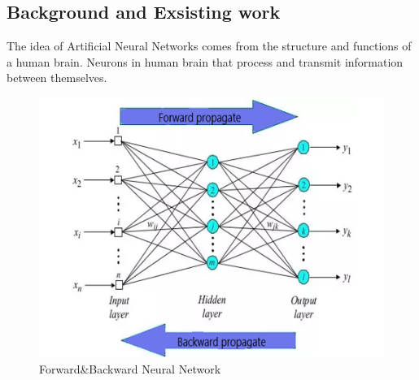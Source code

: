 \documentclass{article}
\begin{document}
\subsection{Background and Exsisting work}
The idea of Artificial Neural Networks comes from the structure and functions of a human brain. Neurons in human brain that process and transmit information between themselves.
\begin{figure}[H]
\includegraphics[scale=0.65]{img/NN_general.png}
\centering
\caption{Forward\&Backward Neural Network}
\end{figure}
\end{document}
